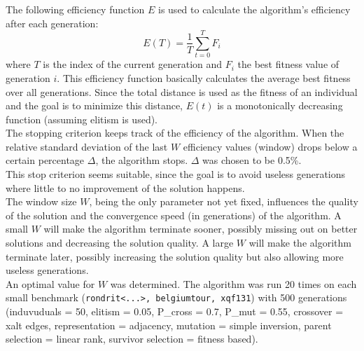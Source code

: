 

The following efficiency function $E$ is used to calculate the algorithm's efficiency after each generation:
\begin{equation}
    E(T) = \frac{1}{T} \sum_{t=0}^T F_i
\end{equation}
where $T$ is the index of the current generation and $F_i$ the best fitness value of generation $i$. This efficiency function basically calculates the average best fitness over all generations. Since the total distance is used as the fitness of an individual and the goal is to minimize this distance, $E(t)$ is a monotonically decreasing function (assuming elitism is used).\\
\newline
The stopping criterion keeps track of the efficiency of the algorithm. When the relative standard deviation of the last $W$ efficiency values (window) drops below a certain percentage $\Delta$, the algorithm stops. $\Delta$ was chosen to be 0.5\%.\\
This stop criterion seems suitable, since the goal is to avoid useless generations where little to no improvement of the solution happens.\\
\newline
The window size $W$, being the only parameter not yet fixed, influences the quality of the solution and the convergence speed (in generations) of the algorithm. A small $W$ will make the algorithm terminate sooner, possibly missing out on better solutions and decreasing the solution quality. A large $W$ will make the algorithm terminate later, possibly increasing the solution quality but also allowing more useless generations.\\
\newline
An optimal value for $W$ was determined. The algorithm was run 20 times on each small benchmark (\texttt{rondrit<...>, belgiumtour, xqf131}) with 500 generations (induvuduals = 50, elitism = 0.05, P\_cross = 0.7, P\_mut = 0.55, crossover = xalt edges, representation = adjacency, mutation = simple inversion, parent selection = linear rank, survivor selection = fitness based). \\
